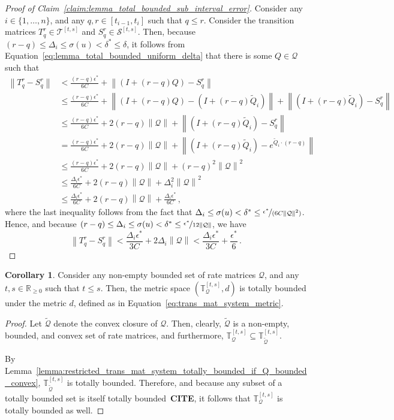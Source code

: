 \documentclass[10pt]{paper}
\theoremstyle{definition}
\newtheorem{corollary}[theorem]{Corollary}
\newcommand{\reals}{\mathbb{R}}
\newcommand{\realsnonneg}{\reals_{\geq 0}}
\newcommand{\rateset}{\mathcal{Q}}
\newcommand{\norm}[1]{\left\lVert #1 \right\rVert}
\begin{document}
\begin{proof}[Proof of Claim~\ref{claim:lemma_total_bounded_sub_interval_error}]
Consider any $i\in\{1,\ldots,n\}$, and any $q,r\in[t_{i-1},t_i]$ such that $q\leq r$. Consider the transition matrices $T_q^r\in\mathcal{T}^{[t,s]}$ and $S_q^r\in\mathcal{S}^{[t,s]}$. Then, because $(r-q)\leq\Delta_i\leq\sigma(u)<\delta^*\leq\delta$, it follows from Equation~\ref{eq:lemma_total_bounded_uniform_delta} that there is some $Q\in\rateset$ such that
\begin{align*}
\norm{T_q^r - S_q^r} &< \frac{(r-q)\epsilon^*}{6C} + \norm{(I+(r-q)Q) - S_q^r} \\
 &\leq \frac{(r-q)\epsilon^*}{6C} + \norm{(I+(r-q)Q) - (I+(r-q)\widetilde{Q}_i)} + \norm{(I+(r-q)\widetilde{Q}_i) - S_q^r} \\
 &\leq \frac{(r-q)\epsilon^*}{6C} + 2(r-q)\norm{\rateset} + \norm{(I+(r-q)\widetilde{Q}_i) - S_q^r} \\
 &= \frac{(r-q)\epsilon^*}{6C} + 2(r-q)\norm{\rateset} + \norm{(I+(r-q)\widetilde{Q}_i) - e^{\widetilde{Q}_i\cdot(r-q)}} \\
 &\leq \frac{(r-q)\epsilon^*}{6C} + 2(r-q)\norm{\rateset} + (r-q)^2\norm{\rateset}^2 \\
 &\leq \frac{\Delta_i\epsilon^*}{6C} + 2(r-q)\norm{\rateset} + \Delta_i^2\norm{\rateset}^2 \\
 &\leq \frac{\Delta_i\epsilon^*}{6C} + 2(r-q)\norm{\rateset} + \frac{\Delta_i\epsilon^*}{6C}\,,
\end{align*}
where the last inequality follows from the fact that $\Delta_i\leq\sigma(u)<\delta^*\leq\nicefrac{\epsilon^*}{(6C\norm{\rateset}^2)}$. Hence, and because $(r-q)\leq\Delta_i\leq\sigma(u)<\delta^*\leq\nicefrac{\epsilon^*}{12\norm{\rateset}}$, we have
\begin{equation*}
\norm{T_q^r - S_q^r} < \frac{\Delta_i\epsilon^*}{3C} + 2\Delta_i\norm{\rateset} < \frac{\Delta_i\epsilon^*}{3C} + \frac{\epsilon^*}{6}\,.
\end{equation*}
\end{proof}

\begin{corollary}\label{cor:restricted_trans_mat_system_totally_bounded_if_Q_bounded}
Consider any non-empty bounded set of rate matrices $\rateset$, and any $t,s\in\realsnonneg$ such that $t\leq s$. Then, the metric space $(\mathbb{T}_\rateset^{[t,s]},d)$ is totally bounded under the metric $d$, defined as in Equation~\eqref{eq:trans_mat_system_metric}.
\end{corollary}
\begin{proof}
Let $\widetilde{\rateset}$ denote the convex closure of $\rateset$. Then, clearly, $\widetilde{\rateset}$ is a non-empty, bounded, and convex set of rate matrices, and furthermore, $\mathbb{T}_\rateset^{[t,s]}\subseteq \mathbb{T}_{\widetilde{\rateset}}^{[t,s]}$.

By Lemma~\ref{lemma:restricted_trans_mat_system_totally_bounded_if_Q_bounded_convex}, $\mathbb{T}_{\widetilde{\rateset}}^{[t,s]}$ is totally bounded. Therefore, and because any subset of a totally bounded set is itself totally bounded~{\bf CITE}, it follows that $\mathbb{T}_\rateset^{[t,s]}$ is totally bounded as well.
\end{proof}
\end{document}
